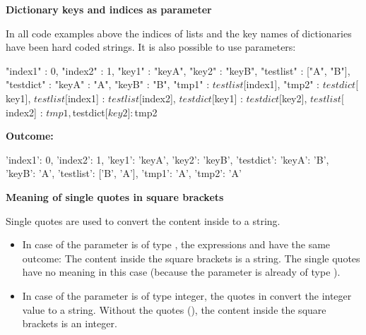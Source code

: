 \vspace{2ex}

\textbf{Dictionary keys and indices as parameter}

In all code examples above the indices of lists and the key names of dictionaries have been hard coded strings. It is also possible to use parameters:

\begin{pythoncode}
{
   "index1"               : 0,
   "index2"               : 1,
   "key1"                 : "keyA",
   "key2"                 : "keyB",
   "testlist"             : ["A", "B"],
   "testdict"             : {"keyA" : "A", "keyB" : "B"},
   "tmp1"                 : ${testlist}[${index1}],
   "tmp2"                 : ${testdict}[${key1}],
   ${testlist}[${index1}] : ${testlist}[${index2}],
   ${testdict}[${key1}]   : ${testdict}[${key2}],
   ${testlist}[${index2}] : ${tmp1},
   ${testdict}[${key2}]   : ${tmp2}
}
\end{pythoncode}

\textbf{Outcome:}

\vspace{2ex}

\begin{pythonlog}
{'index1': 0,
 'index2': 1,
 'key1': 'keyA',
 'key2': 'keyB',
 'testdict': {'keyA': 'B', 'keyB': 'A'},
 'testlist': ['B', 'A'],
 'tmp1': 'A',
 'tmp2': 'A'}
\end{pythonlog}


\newpage

\textbf{Meaning of single quotes in square brackets}

Single quotes are used to convert the content inside to a string.

\begin{itemize}
   \item In case of the parameter  is of type , the expressions \pcode{[$\{param\}]} and \pcode{['$\{param\}']} have the same outcome:
         The content inside the square brackets is a string. The single quotes have no meaning in this case (because the parameter is already of type ).
   \item In case of the parameter  is of type integer, the quotes in \pcode{['$\{param\}']} convert the integer value to a string.
         Without the quotes (\pcode{[$\{param\}]}), the content inside the square brackets is an integer.
\end{itemize}

